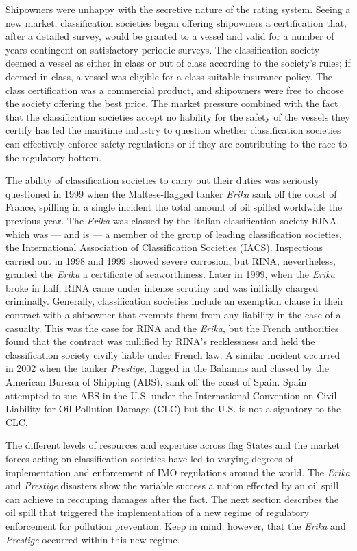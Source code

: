 \documentclass[twoside,symmetric,notoc]{tufte-book}
\begin{document}
\par{%
Shipowners were unhappy with the secretive nature of the rating system. Seeing a new market, classification societies began offering shipowners a certification that, after a detailed survey, would be granted to a vessel and valid for a number of years contingent on satisfactory periodic surveys. The classification society deemed a vessel as either in class or out of class according to the society's rules; if deemed in class, a vessel was eligible for a class-suitable insurance policy. The class certification was a commercial product, and shipowners were free to choose the society offering the best price.\cite{Boisson} The market pressure combined with the fact that the classification societies accept no liability for the safety of the vessels they certify has led the maritime industry to question whether classification societies can effectively enforce safety regulations or if they are contributing to the race to the regulatory bottom.\cite{Talley}
}
\par{
The ability of classification societies to carry out their duties was seriously questioned in 1999 when the Maltese-flagged tanker \textit{Erika} sank off the coast of France, spilling in a single incident the total amount of oil spilled worldwide the previous year. The \textit{Erika} was classed by the Italian classification society RINA, which was --- and is --- a member of the group of leading classification societies, the International Association of Classification Societies (IACS). Inspections carried out in 1998 and 1999 showed severe corrosion, but RINA, nevertheless, granted the \textit{Erika} a certificate of seaworthiness. Later in 1999, when the \textit{Erika} broke in half, RINA came under intense scrutiny and was initially charged criminally. Generally, classification societies include an exemption clause in their contract with a shipowner that exempts them from any liability in the case of a casualty. This was the case for RINA and the \textit{Erika}, but the French authorities found that the contract was nullified by RINA's recklessness and held the classification society civilly liable under French law.\cite{Gahlen} A similar incident occurred in 2002 when the tanker \textit{Prestige}, flagged in the Bahamas and classed by the American Bureau of Shipping (ABS), sank off the coast of Spain. Spain attempted to sue ABS in the U.S. under the International Convention on Civil Liability for Oil Pollution Damage (CLC) but the U.S. is not a signatory to the CLC.\cite{Kearney}
}
\par{The different levels of resources and expertise across flag States and the market forces acting on classification societies have led to varying degrees of implementation and enforcement of IMO regulations around the world.\cite{Mansell_class} The \textit{Erika} and \textit{Prestige} disasters show the variable success a nation effected by an oil spill can achieve in recouping damages after the fact. The next section describes the oil spill that triggered the implementation of a new regime of regulatory enforcement for pollution prevention. Keep in mind, however, that the \textit{Erika} and \textit{Prestige} occurred within this new regime.
}
\end{document}
